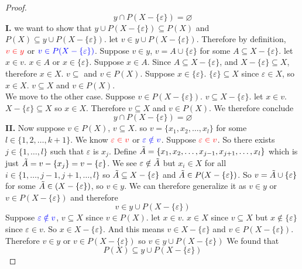 \documentclass[12pt]{book}
\newcommand{\paren}[1]{\left( #1 \right)}
\begin{document}
\begin{proof}
            \[
            y \cap P(X - \{\varepsilon\}) = \varnothing
            \]
        \textbf{I.} we want to show that $y \cup P(X - \{ \varepsilon \}) \subseteq P(X)$ and $P(X) \subseteq y \cup P(X - \{ \varepsilon \})$. let $v \in y \cup P(X - \{ \varepsilon \})$. Therefore by definition, $ \textcolor{red}{v \in y}  $ or $ \textcolor{blue}{v \in P(X - \{ \varepsilon \})}$. Suppose $ v \in y$, $v = A \cup \{\varepsilon\}$ for some $A \subseteq X - \{ \varepsilon \}  $. let $x \in v$. $x \in A$ or $x \in \{\varepsilon\}$. Suppose $x \in A$. Since $A \subseteq X - \{ \varepsilon \}$, and $X - \{ \varepsilon \} \subseteq X$, therefore $x \in X$. $v \subseteq$ and $v \in P(X)$. Suppose $x \in \{\varepsilon\}$. $\{\varepsilon\} \subseteq X$ since $\varepsilon \in X$, so $ x \in X$. $v \subseteq X$ and $v \in P(X)$. \\
        We move to the other case. Suppose $ v \in P(X - \{ \varepsilon \})$. $v \subseteq X - \{ \varepsilon \}$. let $x \in v$. $X - \{ \varepsilon \} \subseteq X$ so $x \in X$. Therefore $v \subseteq X$ and $v \in P(X)$. We therefore conclude
        \[
        y \cap P(X - \{\varepsilon\}) = \varnothing
        \]
        \textbf{II.} Now suppose $v \in P(X)$, $v \subseteq X$. so $v = \{x_1,x_2,\ldots,x_l\}$ for some $l \in \{1,2,\ldots,k+1\}$. We know $\textcolor{red}{\varepsilon \in v}$ or $\textcolor{blue}{\varepsilon \notin v}$. Suppose $\textcolor{red}{\varepsilon \in v}$. So there exists $j \in \{ 1,\ldots,l\}$ such that $\varepsilon$ is $x_j$. Define $\Tilde{A} = \{x_1,x_2,\ldots , x_{j-1},x_{j+1},\ldots,x_l\}$ which is just $\Tilde{A} = v - \{x_j\} = v - \{ \varepsilon \}$. We see $\varepsilon \notin \Tilde{A}$ but $x_i \in X$ for all $i \in \{ 1, \ldots, j-1,j+1,\ldots,l\}$ so $\Tilde{A} \subseteq X - \{ \varepsilon  \} $ and $ \Tilde{A} \in P(X - \{ \varepsilon  \} ) $. So $v = \Tilde{A} \cup \{ \varepsilon \}$ for some $\Tilde{A} \in (X - \{ \varepsilon  \})$, so $v \in y$. We can therefore generalize it as $v \in y$ or $v \in P(X - \{ \varepsilon  \})$ and therefore
        \[
        v \in y \cup P(X - \{ \varepsilon  \} )
        \]
        Suppose $\textcolor{blue}{\varepsilon \notin v}$, $v \subseteq X$ since $v \in P(X)$. let $x \in v$. $x \in X$ since $v \subseteq X$ but $x \notin \{ \varepsilon\}$ since $\varepsilon \in v$. So $x \in X - \{ \varepsilon  \} $. And this means $v \in X - \{\varepsilon\}$ and $v \in P(X - \{\varepsilon\})$. Therefore $v \in y$ or $v \in P(X - \{\varepsilon\})$ so $v \in y \cup P(X - \{\varepsilon\})$
        We found that
        \[
        P(X) \subseteq y \cup P\paren{X - \{\varepsilon\}}
\]
\end{proof}
\end{document}
